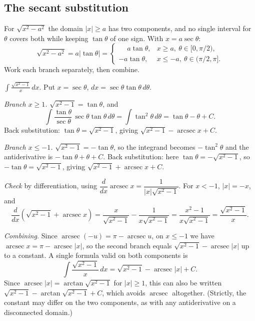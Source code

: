 \documentclass{essay}
\DeclareMathOperator{\arcsec}{arcsec}
\begin{document}
\subsection{The secant substitution}

For $\sqrt{x^2 - a^2}$ the domain $|x| \ge a$ has two components, and no
single interval for $\theta$ covers both while keeping $\tan\theta$ of
one sign. With $x = a\sec\theta$:
\[
\sqrt{x^2 - a^2} = a|\tan\theta| =
\begin{cases}
  \phantom{-}a\tan\theta, & x \ge a,\ \theta \in [0, \pi/2), \\
  -a\tan\theta, & x \le -a,\ \theta \in (\pi/2, \pi].
\end{cases}
\]
Work each branch separately, then combine.

\begin{example}\label{ex:secant}
$\displaystyle\int \frac{\sqrt{x^2 - 1}}{x}\,dx$. Put $x = \sec\theta$,
$dx = \sec\theta\tan\theta\,d\theta$.

\emph{Branch $x \ge 1$.} $\sqrt{x^2 - 1} = \tan\theta$, and
\[
\int \frac{\tan\theta}{\sec\theta}\,\sec\theta\tan\theta\,d\theta
= \int \tan^2\theta\,d\theta
= \tan\theta - \theta + C.
\]
Back substitution: $\tan\theta = \sqrt{x^2 - 1}$, giving
$\sqrt{x^2 - 1} - \arcsec x + C$.

\emph{Branch $x \le -1$.} $\sqrt{x^2 - 1} = -\tan\theta$, so the
integrand becomes $-\tan^2\theta$ and the antiderivative is
$-\tan\theta + \theta + C$. Back substitution: here
$\tan\theta = -\sqrt{x^2 - 1}$, so $-\tan\theta = \sqrt{x^2 - 1}$, giving
$\sqrt{x^2 - 1} + \arcsec x + C$.

\emph{Check} by differentiation, using
$\dfrac{d}{dx}\arcsec x = \dfrac{1}{|x|\sqrt{x^2 - 1}}$. For $x < -1$,
$|x| = -x$, and
\[
\frac{d}{dx}\left(\sqrt{x^2 - 1} + \arcsec x\right)
= \frac{x}{\sqrt{x^2 - 1}} - \frac{1}{x\sqrt{x^2 - 1}}
= \frac{x^2 - 1}{x\sqrt{x^2 - 1}}
= \frac{\sqrt{x^2 - 1}}{x}.
\]

\emph{Combining.} Since $\arcsec(-u) = \pi - \arcsec u$, on $x \le -1$
we have $\arcsec x = \pi - \arcsec|x|$, so the second branch equals
$\sqrt{x^2 - 1} - \arcsec|x|$ up to a constant. A single formula valid on
both components is
\[
\int \frac{\sqrt{x^2 - 1}}{x}\,dx
= \sqrt{x^2 - 1} - \arcsec|x| + C.
\]
Since $\arcsec|x| = \arctan\sqrt{x^2 - 1}$ for $|x| \ge 1$, this can also
be written $\sqrt{x^2 - 1} - \arctan\sqrt{x^2 - 1} + C$, which avoids
$\arcsec$ altogether. (Strictly, the constant may differ on the two
components, as with any antiderivative on a disconnected domain.)
\end{example}
\end{document}
